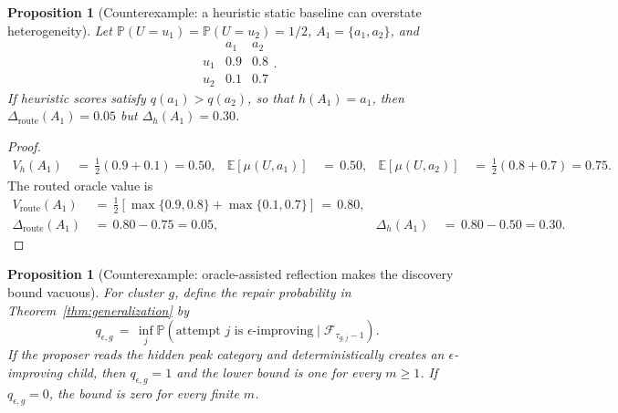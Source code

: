 \documentclass{article} %
\newtheorem{proposition}[theorem]{Proposition}
\begin{document}
\begin{proposition}[Counterexample: a heuristic static baseline can overstate heterogeneity]
\label{prop:9}
Let \(\mathbb P(U=u_1)=\mathbb P(U=u_2)=1/2\),
\(A_1=\{a_1,a_2\}\), and
\begin{equation}
\begin{array}{c|cc}
& a_1 & a_2 \\
\hline
u_1 & 0.9 & 0.8 \\
u_2 & 0.1 & 0.7
\end{array}.
\end{equation}
If heuristic scores satisfy \(q(a_1)>q(a_2)\), so that \(h(A_1)=a_1\), then
\(\Delta_{\mathrm{route}}(A_1)=0.05\) but \(\Delta_h(A_1)=0.30\).
\end{proposition}

\begin{proof}
\begin{equation}
\begin{aligned}
V_h(A_1)
&\,=\,\tfrac12(0.9+0.1)=0.50, &
\mathbb{E}[\mu(U,a_1)]
&\,=\,0.50, &
\mathbb{E}[\mu(U,a_2)]
&\,=\,\tfrac12(0.8+0.7)=0.75.
\end{aligned}
\end{equation}
The routed oracle value is
\begin{equation}
\begin{aligned}
V_{\mathrm{route}}(A_1)
&\,=\,
\tfrac12
\left[
\max\{0.9,0.8\}
+
\max\{0.1,0.7\}
\right]
\,=\,0.80, \\
\Delta_{\mathrm{route}}(A_1)
&\,=\,0.80-0.75=0.05, &
\Delta_h(A_1)
&\,=\,0.80-0.50=0.30.
\end{aligned}
\end{equation}
\end{proof}

\begin{proposition}[Counterexample: oracle-assisted reflection makes the discovery bound vacuous]
\label{prop:10}
For cluster \(g\), define the repair probability in
Theorem~\ref{thm:generalization} by
\begin{equation}
q_{\epsilon,g}
\,=\,
\inf_j
\mathbb{P}
\!\left(
\text{attempt }j\text{ is }\epsilon\text{-improving}
\mid
\mathcal{F}_{\tau_{g,j}-1}
\right).
\end{equation}
If the proposer reads the hidden peak category and deterministically creates
an \(\epsilon\)-improving child, then \(q_{\epsilon,g}=1\) and the lower bound
is one for every \(m\geq1\).  If \(q_{\epsilon,g}=0\), the bound is zero for
every finite \(m\).
\end{proposition}
\end{document}
